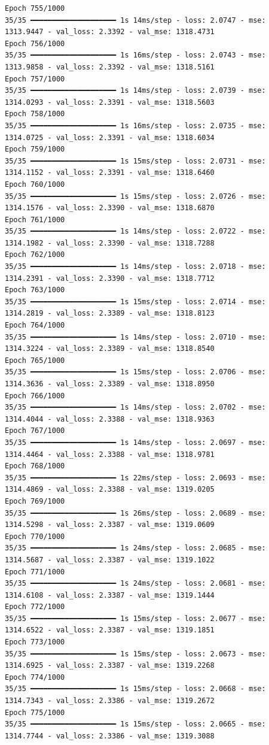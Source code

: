 \documentclass[
  letterpaper,
  DIV=11,
  numbers=noendperiod]{scrreprt}
\begin{document}
\begin{verbatim}
Epoch 755/1000
35/35 ━━━━━━━━━━━━━━━━━━━━ 1s 14ms/step - loss: 2.0747 - mse: 1313.9447 - val_loss: 2.3392 - val_mse: 1318.4731
Epoch 756/1000
35/35 ━━━━━━━━━━━━━━━━━━━━ 1s 16ms/step - loss: 2.0743 - mse: 1313.9858 - val_loss: 2.3392 - val_mse: 1318.5161
Epoch 757/1000
35/35 ━━━━━━━━━━━━━━━━━━━━ 1s 14ms/step - loss: 2.0739 - mse: 1314.0293 - val_loss: 2.3391 - val_mse: 1318.5603
Epoch 758/1000
35/35 ━━━━━━━━━━━━━━━━━━━━ 1s 16ms/step - loss: 2.0735 - mse: 1314.0725 - val_loss: 2.3391 - val_mse: 1318.6034
Epoch 759/1000
35/35 ━━━━━━━━━━━━━━━━━━━━ 1s 15ms/step - loss: 2.0731 - mse: 1314.1152 - val_loss: 2.3391 - val_mse: 1318.6460
Epoch 760/1000
35/35 ━━━━━━━━━━━━━━━━━━━━ 1s 15ms/step - loss: 2.0726 - mse: 1314.1576 - val_loss: 2.3390 - val_mse: 1318.6870
Epoch 761/1000
35/35 ━━━━━━━━━━━━━━━━━━━━ 1s 14ms/step - loss: 2.0722 - mse: 1314.1982 - val_loss: 2.3390 - val_mse: 1318.7288
Epoch 762/1000
35/35 ━━━━━━━━━━━━━━━━━━━━ 1s 14ms/step - loss: 2.0718 - mse: 1314.2391 - val_loss: 2.3390 - val_mse: 1318.7712
Epoch 763/1000
35/35 ━━━━━━━━━━━━━━━━━━━━ 1s 15ms/step - loss: 2.0714 - mse: 1314.2819 - val_loss: 2.3389 - val_mse: 1318.8123
Epoch 764/1000
35/35 ━━━━━━━━━━━━━━━━━━━━ 1s 14ms/step - loss: 2.0710 - mse: 1314.3224 - val_loss: 2.3389 - val_mse: 1318.8540
Epoch 765/1000
35/35 ━━━━━━━━━━━━━━━━━━━━ 1s 15ms/step - loss: 2.0706 - mse: 1314.3636 - val_loss: 2.3389 - val_mse: 1318.8950
Epoch 766/1000
35/35 ━━━━━━━━━━━━━━━━━━━━ 1s 14ms/step - loss: 2.0702 - mse: 1314.4044 - val_loss: 2.3388 - val_mse: 1318.9363
Epoch 767/1000
35/35 ━━━━━━━━━━━━━━━━━━━━ 1s 14ms/step - loss: 2.0697 - mse: 1314.4464 - val_loss: 2.3388 - val_mse: 1318.9781
Epoch 768/1000
35/35 ━━━━━━━━━━━━━━━━━━━━ 1s 22ms/step - loss: 2.0693 - mse: 1314.4869 - val_loss: 2.3388 - val_mse: 1319.0205
Epoch 769/1000
35/35 ━━━━━━━━━━━━━━━━━━━━ 1s 26ms/step - loss: 2.0689 - mse: 1314.5298 - val_loss: 2.3387 - val_mse: 1319.0609
Epoch 770/1000
35/35 ━━━━━━━━━━━━━━━━━━━━ 1s 24ms/step - loss: 2.0685 - mse: 1314.5687 - val_loss: 2.3387 - val_mse: 1319.1022
Epoch 771/1000
35/35 ━━━━━━━━━━━━━━━━━━━━ 1s 24ms/step - loss: 2.0681 - mse: 1314.6108 - val_loss: 2.3387 - val_mse: 1319.1444
Epoch 772/1000
35/35 ━━━━━━━━━━━━━━━━━━━━ 1s 15ms/step - loss: 2.0677 - mse: 1314.6522 - val_loss: 2.3387 - val_mse: 1319.1851
Epoch 773/1000
35/35 ━━━━━━━━━━━━━━━━━━━━ 1s 15ms/step - loss: 2.0673 - mse: 1314.6925 - val_loss: 2.3387 - val_mse: 1319.2268
Epoch 774/1000
35/35 ━━━━━━━━━━━━━━━━━━━━ 1s 15ms/step - loss: 2.0668 - mse: 1314.7343 - val_loss: 2.3386 - val_mse: 1319.2672
Epoch 775/1000
35/35 ━━━━━━━━━━━━━━━━━━━━ 1s 15ms/step - loss: 2.0665 - mse: 1314.7744 - val_loss: 2.3386 - val_mse: 1319.3088

\end{verbatim}
\end{document}
